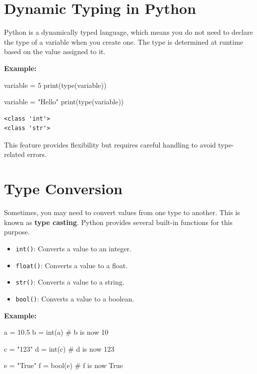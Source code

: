 \documentclass[
  letterpaper,
  DIV=11,
  numbers=noendperiod]{scrreprt}
\newenvironment{Shaded}{\begin{snugshade}}{\end{snugshade}}
\newcommand{\BuiltInTok}[1]{\textcolor[rgb]{0.00,0.23,0.31}{#1}}
\newcommand{\CommentTok}[1]{\textcolor[rgb]{0.37,0.37,0.37}{#1}}
\newcommand{\DecValTok}[1]{\textcolor[rgb]{0.68,0.00,0.00}{#1}}
\newcommand{\FloatTok}[1]{\textcolor[rgb]{0.68,0.00,0.00}{#1}}
\newcommand{\NormalTok}[1]{\textcolor[rgb]{0.00,0.23,0.31}{#1}}
\newcommand{\OperatorTok}[1]{\textcolor[rgb]{0.37,0.37,0.37}{#1}}
\newcommand{\StringTok}[1]{\textcolor[rgb]{0.13,0.47,0.30}{#1}}
\providecommand{\tightlist}{%
  \setlength{\itemsep}{0pt}\setlength{\parskip}{0pt}}\usepackage{longtable,booktabs,array}
\begin{document}
\hypertarget{dynamic-typing-in-python}{%
\section{Dynamic Typing in Python}\label{dynamic-typing-in-python}}

Python is a dynamically typed language, which means you do not need to
declare the type of a variable when you create one. The type is
determined at runtime based on the value assigned to it.

\textbf{Example:}

\begin{Shaded}
\begin{Highlighting}[]
\NormalTok{variable }\OperatorTok{=} \DecValTok{5}
\BuiltInTok{print}\NormalTok{(}\BuiltInTok{type}\NormalTok{(variable)) }

\NormalTok{variable }\OperatorTok{=} \StringTok{"Hello"}
\BuiltInTok{print}\NormalTok{(}\BuiltInTok{type}\NormalTok{(variable)) }
\end{Highlighting}
\end{Shaded}

\begin{verbatim}
<class 'int'>
<class 'str'>
\end{verbatim}

This feature provides flexibility but requires careful handling to avoid
type-related errors.

\hypertarget{type-conversion}{%
\section{Type Conversion}\label{type-conversion}}

Sometimes, you may need to convert values from one type to another. This
is known as \textbf{type casting}. Python provides several built-in
functions for this purpose.

\begin{itemize}
\tightlist
\item
  \texttt{int()}: Converts a value to an integer.
\item
  \texttt{float()}: Converts a value to a float.
\item
  \texttt{str()}: Converts a value to a string.
\item
  \texttt{bool()}: Converts a value to a boolean.
\end{itemize}

\textbf{Example:}

\begin{Shaded}
\begin{Highlighting}[]
\NormalTok{a }\OperatorTok{=} \FloatTok{10.5}
\NormalTok{b }\OperatorTok{=} \BuiltInTok{int}\NormalTok{(a)  }\CommentTok{\# b is now 10}

\NormalTok{c }\OperatorTok{=} \StringTok{"123"}
\NormalTok{d }\OperatorTok{=} \BuiltInTok{int}\NormalTok{(c)  }\CommentTok{\# d is now 123}

\NormalTok{e }\OperatorTok{=} \StringTok{"True"}
\NormalTok{f }\OperatorTok{=} \BuiltInTok{bool}\NormalTok{(e)  }\CommentTok{\# f is now True}
\end{Highlighting}
\end{Shaded}
\end{document}
